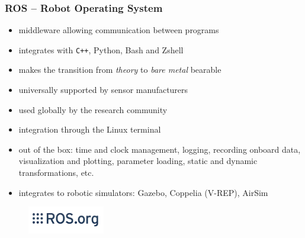 \documentclass[aspectratio=169,9pt]{beamer}
\begin{document}
\begin{frame}
  \frametitle{ROS -- Robot Operating System}

  \begin{itemize}
    \item middleware allowing communication between programs
    \item integrates with \texttt{C++}, Python, Bash and Zshell
    \item makes the transition from \emph{theory} to \emph{bare metal} bearable
    \item universally supported by sensor manufacturers
    \item used globally by the research community
    \item integration through the Linux terminal
    \item out of the box: time and clock management, logging, recording onboard data, visualization and plotting, parameter loading, static and dynamic transformations, etc.
    \item integrates to robotic simulators: Gazebo, Coppelia (V-REP), AirSim
  \end{itemize}

  \begin{figure}
    \includegraphics[width=0.3\textwidth]{fig/ros_logo.jpg}
  \end{figure}

\end{frame}


\end{document}
